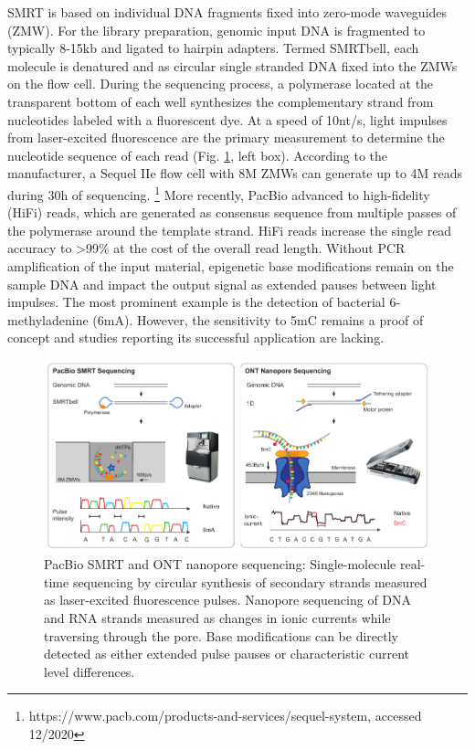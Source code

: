 SMRT is based on individual DNA fragments fixed into zero-mode waveguides (ZMW).
For the library preparation, genomic input DNA is fragmented to typically 8-15kb and ligated to hairpin adapters.
Termed SMRTbell, each molecule is denatured and as circular single stranded DNA fixed into the ZMWs on the flow cell.
During the sequencing process, a polymerase located at the transparent bottom of each well synthesizes the complementary strand from nucleotides labeled with a fluorescent dye.
At a speed of 10nt/s, light impulses from laser-excited fluorescence are the primary measurement to determine the nucleotide sequence of each read (Fig. \ref{fig:intro:longread}, left box).
According to the manufacturer, a Sequel IIe flow cell with 8M ZMWs can generate up to 4M reads during 30h of sequencing. \footnote{https://www.pacb.com/products-and-services/sequel-system, accessed 12/2020}
More recently, PacBio advanced to high-fidelity (HiFi) reads, which are generated as consensus sequence from multiple passes of the polymerase around the template strand.
HiFi reads increase the single read accuracy to >99\% at the cost of the overall read length.
Without PCR amplification of the input material, epigenetic base modifications remain on the sample DNA and impact the output signal as extended pauses between light impulses.
The most prominent example is the detection of bacterial 6-methyladenine (6mA). 
However, the sensitivity to 5mC remains a proof of concept and studies reporting its successful application are lacking.

\begin{figure}[h]
	\centering
	\includegraphics[width=1.0\textwidth]{figures/intro/long_read.pdf}
	\captionsetup{format=plain}
	\caption[Long read sequencing]{PacBio SMRT and ONT nanopore sequencing: Single-molecule real-time sequencing by circular synthesis of secondary strands measured as laser-excited fluorescence pulses. Nanopore sequencing of DNA and RNA strands measured as changes in ionic currents while traversing through the pore. Base modifications can be directly detected as either extended pulse pauses or characteristic current level differences.}
	\label{fig:intro:longread}
\end{figure}

